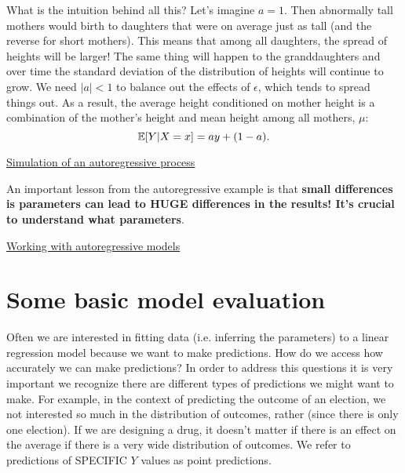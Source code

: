 What is the intuition behind all this? Let's imagine $a=1$. Then abnormally tall mothers would birth to daughters that were on average just as tall (and the reverse for short mothers). This means that among all daughters, the spread of heights will be larger!  The same thing will happen to the granddaughters and over time the standard deviation of the distribution of heights will continue to grow. We need $|a|<1$ to balance out the effects of $\epsilon$, which tends to spread things out. As a result, the average height conditioned on mother height is a combination of the mother's height and mean height among all mothers, $\mu$: 
\begin{equation}
\mathbb E[Y|X=x] = ay + (1-a).
\end{equation}

\begin{example}
\href{https://colab.research.google.com/drive/143hintE_kXYGkEIphvkUz5ngCdNu22F0#scrollTo=XIUxH9Pyav2F&line=1&uniqifier=1}{Simulation of an autoregressive process}
\end{example}

An important lesson from the autoregressive example is that {\bf small differences is parameters can lead to HUGE differences in the results! It's crucial to understand what parameters}.

\begin{exercise}
\href{https://colab.research.google.com/drive/143hintE_kXYGkEIphvkUz5ngCdNu22F0#scrollTo=XIUxH9Pyav2F&line=1&uniqifier=1}{Working with autoregressive models}
\end{exercise}


\section{Some basic model evaluation}

Often we are interested in fitting data (i.e. inferring the parameters) to a linear regression model because we want to make predictions. How do we access how accurately we can make predictions? In order to address this questions it is very important we recognize there are different types of predictions we might want to make. For example, in the context of predicting the outcome of an election, we not interested so much in the distribution of outcomes, rather (since there is only one election). If we are designing a drug, it doesn't matter if there is an effect on the average if there is a very wide distribution of outcomes. We refer to predictions of SPECIFIC $Y$ values as {\dfn point predictions}. 

